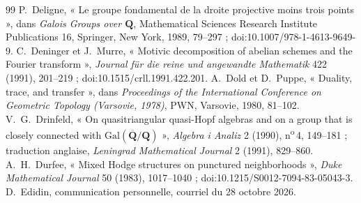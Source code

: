 \documentclass[11pt]{article}
\theoremstyle{plain}
\theoremstyle{definition}
\theoremstyle{plain}
\theoremstyle{definition}
\theoremstyle{remark}
\renewcommand{\_}{\bkunderscore\allowbreak}
\begin{document}
\begin{thebibliography}{99}
 P.~Deligne, « Le groupe fondamental de la droite projective moins trois points », dans \emph{Galois Groups over $\mathbf Q$}, Mathematical Sciences Research Institute Publications 16, Springer, New York, 1989, 79--297 ; doi:10.1007/978-1-4613-9649-9\_3.
 C.~Deninger et J.~Murre, « Motivic decomposition of abelian schemes and the Fourier transform », \emph{Journal für die reine und angewandte Mathematik} 422 (1991), 201--219 ; doi:10.1515/crll.1991.422.201.
 A.~Dold et D.~Puppe, « Duality, trace, and transfer », dans \emph{Proceedings of the International Conference on Geometric Topology (Varsovie, 1978)}, PWN, Varsovie, 1980, 81--102.
 V.~G.~Drinfeld, « On quasitriangular quasi-Hopf algebras and on a group that is closely connected with $\mathrm{Gal}(\overline{\mathbf Q}/\mathbf Q)$ », \emph{Algebra i Analiz} 2 (1990), n\textsuperscript{o}\,4, 149--181 ; traduction anglaise, \emph{Leningrad Mathematical Journal} 2 (1991), 829--860.
 A.~H.~Durfee, « Mixed Hodge structures on punctured neighborhoods », \emph{Duke Mathematical Journal} 50 (1983), 1017--1040 ; doi:10.1215/S0012-7094-83-05043-3.
 D.~Edidin, communication personnelle, courriel du 28 octobre 2026.


\end{thebibliography}
\end{document}
